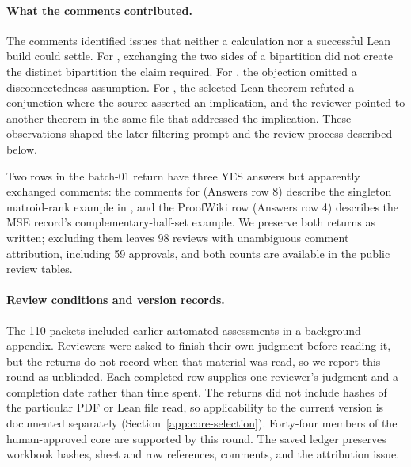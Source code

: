 \paragraph{What the comments contributed.}
The comments identified issues that neither a calculation nor a successful Lean build could settle. For , exchanging the two sides of a bipartition did not create the distinct bipartition the claim required. For , the objection omitted a disconnectedness assumption. For , the selected Lean theorem refuted a conjunction where the source asserted an implication, and the reviewer pointed to another theorem in the same file that addressed the implication. These observations shaped the later filtering prompt and the review process described below.

Two rows in the batch-01 return have three YES answers but apparently exchanged comments: the comments for  (Answers row 8) describe the singleton matroid-rank example in , and the ProofWiki row (Answers row 4) describes the MSE record's complementary-half-set example. We preserve both returns as written; excluding them leaves 98 reviews with unambiguous comment attribution, including 59 approvals, and both counts are available in the public review tables.

\paragraph{Review conditions and version records.}
The 110 packets included earlier automated assessments in a background appendix. Reviewers were asked to finish their own judgment before reading it, but the returns do not record when that material was read, so we report this round as unblinded. Each completed row supplies one reviewer's judgment and a completion date rather than time spent. The returns did not include hashes of the particular PDF or Lean file read, so applicability to the current version is documented separately (Section~\ref{app:core-selection}). Forty-four members of the human-approved core are supported by this round. The saved ledger preserves workbook hashes, sheet and row references, comments, and the attribution issue.

